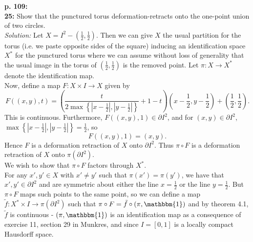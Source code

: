 \documentclass[a4paper]{article}
\begin{document}
    \textbf{p. 109:}\\
    \textbf{25:} Show that the punctured torus deformation-retracts onto the
    one-point union of two circles.\\
    \linebreak
    \textit{Solution:} 
    Let $X = I^2 - (\frac{1}{2}, \frac{1}{2})$. Then we can
    give  $X$ the usual partition for the torus (i.e. we paste opposite sides
    of the square) inducing an identification space $X^{*}$ for the punctured
    torus where we can assume without loss of generality that the usual image
    in the torus of
     $(\frac{1}{2}, \frac{1}{2})$ is the removed point. Let $\pi  \colon X \to X^{*}$ denote
     the identification map.\\
     Now, define a map
    $F  \colon X \times I \to X$ given by
    \[
    F((x,y),t) = \left( \frac{t}{2 \max \left\{ 
    \left| x - \frac{1}{2} \right| ,
\left| y - \frac{1}{2} \right| \right\} }
+ 1 -t \right) \left(x-\frac{1}{2}, y - \frac{1}{2} \right) + \left( \frac{1}{2},
\frac{1}{2} \right).
    \] 
    This is continuous. Furthermore,
    $F\left( (x,y), 1 \right) 
    \in \partial I^2$, and
    for $(x,y) \in \partial I^2$,
    $\max \left\{ 
    \left| x- \frac{1}{2} \right| ,
\left| y - \frac{1}{2} \right| \right\} = \frac{1}{2}$, so
    \[
    F((x,y), 1)
    = (x,y).
    \] 
    Hence $F$ is a deformation retraction of $X$ onto
    $\partial I^2$. Thus
    $\pi \circ F$ is a deformation retraction of
    $X$ onto $\pi \left( \partial I^2 \right) $.\\
    \linebreak
    We wish to show that $\pi \circ F$ factors through $X^{*}$.\\
    \linebreak
    For any $x',y' \in X$ with $x'\neq y'$ such that $\pi(x') = \pi(y')$, we have
    that $x',y' \in \partial I^2$ and are symmetric about either the line
    $x = \frac{1}{2}$ or the line $y = \frac{1}{2}$. But 
    $\pi \circ F$ maps such points to the same point, so we can define
    a map $\tilde{f}  \colon X^{*} \times I \to \pi\left( \partial I^2 \right) $ such
    that
    $\pi \circ F = \tilde{f} \circ \left( \pi, \mathbbm{1} \right) $ and by theorem 4.1, 
    $\tilde{f}$ is continuous - $\left( \pi, \mathbbm{1} \right) $ is
    an identification map as a consequence of exercise 11, section 29 in
    Munkres,
    and since $I = \left[ 0,1 \right] $ is a locally compact
    Hausdorff space.\\
    \linebreak
\end{document}
